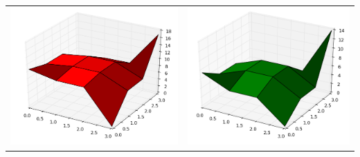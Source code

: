 \documentclass[mathserif]{beamer}
\begin{document}
	\begin{frame} %
	\center
	
	\begin{tabular}{cc}
	\includegraphics[scale=0.22]{realtests_sketchmin1.png} & 			 	\includegraphics[scale=0.22]{realtests_real1.png} \\
	

\end{tabular}
\end{frame}
\end{document}
